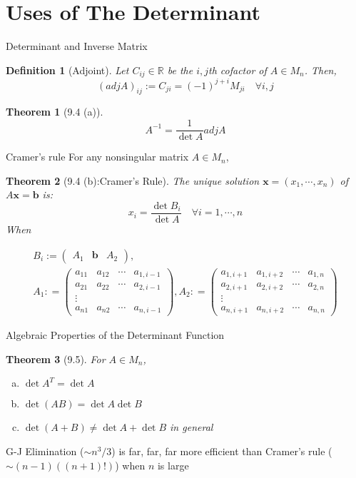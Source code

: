 \documentclass[a4paper,11pt]{article}
\newtheorem{defn}{Definition}
\newtheorem{thm}{Theorem}
\begin{document}
\section{Uses of The Determinant} %
\label{sec:uses_of_the_determinant}
\begin{frame}[t]{Determinant and Inverse Matrix}
	\begin{defn}
		[Adjoint] Let $C_{ij}\in\mathbb{R}$ be the $i,j$th cofactor of $A\in M_n$. Then, \[
			(adj A)_{ij}:=C_{ji} = (-1)^{j+i}M_{ji} \quad\forall i,j
		\]
	\end{defn}
	\begin{thm}
		[9.4 (a)]\[
			A^{-1} = \frac{1}{\det A}adj A
		\]
	\end{thm}
\end{frame}
\begin{frame}[t]{Cramer's rule}
	For any nonsingular matrix $A\in M_n$,
	\begin{thm}
		[9.4 (b):Cramer's Rule]
			The unique solution $\mathbf{x}=(x_1,\cdots,x_n)$ of $A\mathbf{x}=\mathbf{b}$ is:
			\[
				x_i = \frac{\det B_i}{\det A} \quad\forall i=1,\cdots,n
			\] When
			\begin{tiny}
				\begin{multline*}
					B_i := \begin{pmatrix}
						A_1 & \mathbf{b} & A_2
					\end{pmatrix},\\ A_1 : = \begin{pmatrix}
						a_{11}&a_{12}&\cdots&a_{1,i-1}\\
						a_{21}&a_{22}&\cdots&a_{2,i-1}\\
						\vdots\\
						a_{n1}&a_{n2}&\cdots&a_{n,i-1}
					\end{pmatrix}, A_2 : = \begin{pmatrix}
						a_{1,i+1}&a_{1,i+2}&\cdots&a_{1,n}\\
						a_{2,i+1}&a_{2,i+2}&\cdots&a_{2,n}\\
						\vdots\\
						a_{n,i+1}&a_{n,i+2}&\cdots&a_{n,n}
					\end{pmatrix}
				\end{multline*}
			\end{tiny}
	\end{thm}
\end{frame}
\begin{frame}[t]{Algebraic Properties of the Determinant Function}
	\begin{thm}
		[9.5] For $A\in M_n$,
		\begin{enumerate}[(a)]
			\item $\det A^T = \det A$
			\item $\det(AB)=\det A \det B$
			\item $\det(A+B)\neq \det A + \det B$ in general
		\end{enumerate}
	\end{thm}
	G-J Elimination ($\sim n^3/3$) is far, far, far more efficient than Cramer's rule ($\sim (n-1)((n+1)!)$) when $n$ is large
\end{frame}
\end{document}
